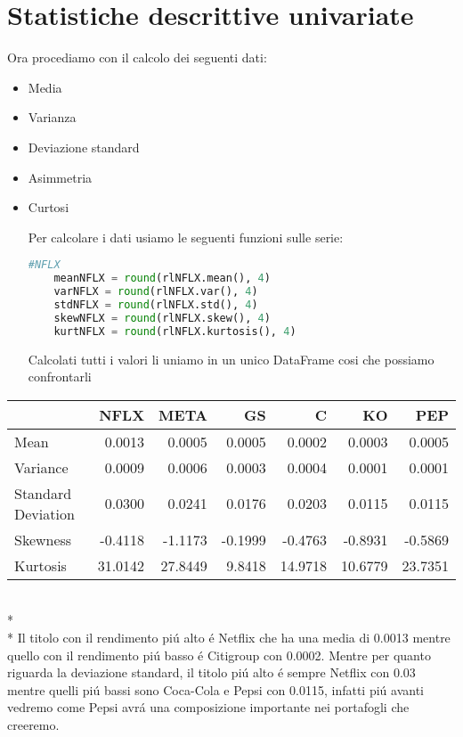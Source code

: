 \documentclass{report}
\begin{document}
\section{Statistiche descrittive univariate}
Ora procediamo con il calcolo dei seguenti dati:
\begin{itemize}[leftmargin=30pt, rightmargin=2cm]
\item Media
\item Varianza
\item Deviazione standard
\item Asimmetria
\item Curtosi

\noindent Per calcolare i dati usiamo le seguenti funzioni sulle serie:
\begin{lstlisting}[language=python]
    #NFLX
    meanNFLX = round(rlNFLX.mean(), 4)
    varNFLX = round(rlNFLX.var(), 4)
    stdNFLX = round(rlNFLX.std(), 4)
    skewNFLX = round(rlNFLX.skew(), 4)
    kurtNFLX = round(rlNFLX.kurtosis(), 4)
\end{lstlisting}
Calcolati tutti i valori li uniamo in un unico DataFrame cosi che possiamo confrontarli
\end{itemize}
\begin{tabular}{lrrrrrr}
\toprule
{} &     NFLX &     META &      GS &        C &       KO &      PEP \\
\midrule
Mean               &   0.0013 &   0.0005 &  0.0005 &   0.0002 &   0.0003 &   0.0005 \\
Variance           &   0.0009 &   0.0006 &  0.0003 &   0.0004 &   0.0001 &   0.0001 \\
Standard Deviation &   0.0300 &   0.0241 &  0.0176 &   0.0203 &   0.0115 &   0.0115 \\
Skewness           &  -0.4118 &  -1.1173 & -0.1999 &  -0.4763 &  -0.8931 &  -0.5869 \\
Kurtosis           &  31.0142 &  27.8449 &  9.8418 &  14.9718 &  10.6779 &  23.7351 \\
\bottomrule
\end{tabular}
\\*
\\*
\noindent Il titolo con il rendimento piú alto é Netflix che ha una media di \num{0.0013} mentre quello con il rendimento piú basso é Citigroup con \num{0.0002}.
Mentre per quanto riguarda la deviazione standard, il titolo piú alto é sempre Netflix con \num{0.03} mentre quelli piú bassi sono Coca-Cola e Pepsi con \num{0.0115}, infatti piú avanti vedremo come Pepsi avrá una composizione importante nei portafogli che creeremo.
\end{document}
